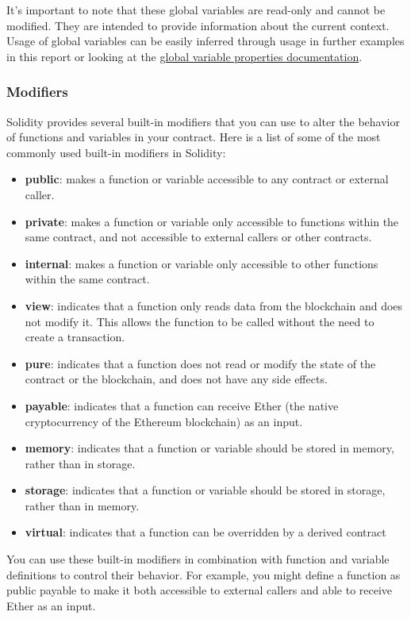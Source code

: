 \documentclass{article}
\theoremstyle{theorem}
\theoremstyle{definition}
\theoremstyle{remark}
\begin{document}
\medskip\noindent
It's important to note that these global variables are read-only and cannot be modified. They are intended to provide information about the current context. Usage of global variables can be easily inferred through usage in further examples in this report or looking at the \href{https://docs.soliditylang.org/en/v0.8.17/units-and-global-variables.html?highlight=msg#block-and-transaction-properties}{global variable properties documentation}.

\subsubsection{Modifiers} \label{modifier}
Solidity provides several built-in modifiers that you can use to alter the behavior of functions and variables in your contract. Here is a list of some of the most commonly used built-in modifiers in Solidity:
\begin{itemize}
    
    \item \textbf{public}: makes a function or variable accessible to any contract or external caller.
    \item \textbf{private}: makes a function or variable only accessible to functions within the same contract, and not accessible to external callers or other contracts.
    \item \textbf{internal}: makes a function or variable only accessible to other functions within the same contract.
    \item \textbf{view}: indicates that a function only reads data from the blockchain and does not modify it. This allows the function to be called without the need to create a transaction.
    \item \textbf{pure}: indicates that a function does not read or modify the state of the contract or the blockchain, and does not have any side effects.
    \item \textbf{payable}: indicates that a function can receive Ether (the native cryptocurrency of the Ethereum blockchain) as an input.
    \item \textbf{memory}: indicates that a function or variable should be stored in memory, rather than in storage.
    \item \textbf{storage}: indicates that a function or variable should be stored in storage, rather than in memory.
    \item \textbf{virtual}: indicates that a function can be overridden by a derived contract
\end{itemize}
You can use these built-in modifiers in combination with function and variable definitions to control their behavior. For example, you might define a function as \colorbox{Gainsboro!60!Lavender}{public payable} to make it both accessible to external callers and able to receive Ether as an input.
\end{document}
